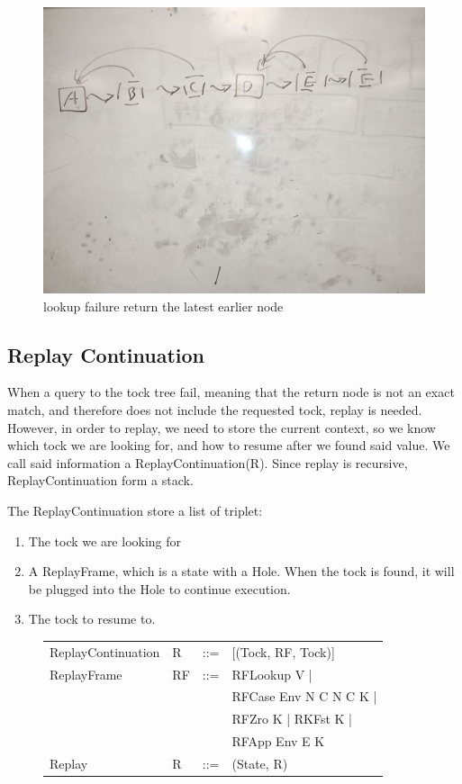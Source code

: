 \begin{figure}
    \includegraphics[width=0.5\columnwidth]{img4}
    \caption{lookup failure return the latest earlier node}
\end{figure}

\subsection{Replay Continuation}
When a query to the tock tree fail, meaning that the return node is not an exact match, and therefore does not include the requested tock, replay is needed. However, in order to replay, we need to store the current context, so we know which tock we are looking for, and how to resume after we found said value. We call said information a ReplayContinuation(R). Since replay is recursive, ReplayContinuation form a stack.

The ReplayContinuation store a list of triplet:
\begin{enumerate}
	\item The tock we are looking for
	\item A ReplayFrame, which is a state with a Hole. When the tock is found, it will be plugged into the Hole to continue execution.
	\item The tock to resume to.
\end{enumerate}

\begin{figure}
    \begin{tabular}{p{10em} p{2.6em} p{1em} p{}}
        ReplayContinuation & R & ::= & [(Tock, RF, Tock)] \\
        ReplayFrame & RF & ::= & RFLookup V | \\
        & & & RFCase Env N C N C K | \\
        & & & RFZro K | RKFst K | \\
        & & & RFApp Env E K \\
        Replay & R & ::= & (State, R) \\
    \end{tabular}
\end{figure}

